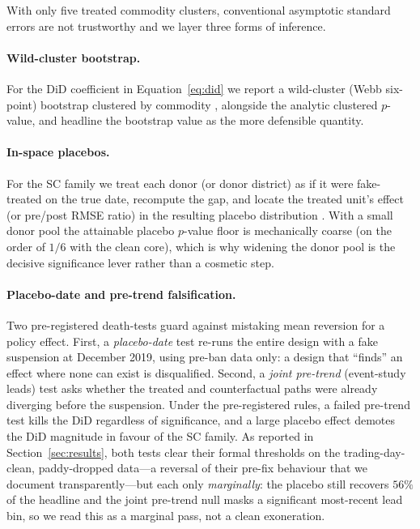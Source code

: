 With only five treated commodity clusters, conventional asymptotic standard errors are not
trustworthy and we layer three forms of inference.

\paragraph{Wild-cluster bootstrap.}
For the DiD coefficient in Equation~\eqref{eq:did} we report a wild-cluster (Webb six-point)
bootstrap clustered by commodity \citep{CameronGelbachMiller, MacKinnonWebb}, alongside the
analytic clustered $p$-value, and headline the bootstrap value as the more defensible quantity.

\paragraph{In-space placebos.}
For the SC family we treat each donor (or donor district) as if it were fake-treated on the
true date, recompute the gap, and locate the treated unit's effect (or pre/post RMSE ratio)
in the resulting placebo distribution \citep{Abadie2010}. With a small donor pool the attainable
placebo $p$-value floor is mechanically coarse (on the order of $1/6$ with the clean core),
which is why widening the donor pool is the decisive significance lever rather than a cosmetic step.

\paragraph{Placebo-date and pre-trend falsification.}
Two pre-registered death-tests guard against mistaking mean reversion for a policy effect.
First, a \emph{placebo-date} test re-runs the entire design with a fake suspension at
December 2019, using pre-ban data only: a design that ``finds'' an effect where none can
exist is disqualified. Second, a \emph{joint pre-trend} (event-study leads) test asks whether
the treated and counterfactual paths were already diverging before the suspension. Under the
pre-registered rules, a failed pre-trend test kills the DiD regardless of significance, and a
large placebo effect demotes the DiD magnitude in favour of the SC family. As reported in
Section~\ref{sec:results}, both tests clear their formal thresholds on the
trading-day-clean, paddy-dropped data---a reversal of their pre-fix behaviour that we
document transparently---but each only \emph{marginally}: the placebo still recovers
$56\%$ of the headline and the joint pre-trend null masks a significant most-recent
lead bin, so we read this as a marginal pass, not a clean exoneration.

